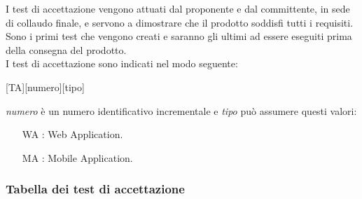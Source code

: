 \documentclass[../../piano-di-qualifica.tex]{subfiles}
\begin{document}
I test di accettazione vengono attuati dal proponente e dal committente, in sede di collaudo finale, e servono a dimostrare che il prodotto soddisfi tutti i requisiti.
Sono i primi test che vengono creati e saranno gli ultimi ad essere eseguiti prima della consegna del prodotto.\\

I test di accettazione sono indicati nel modo seguente:
\begin{center}
  [TA][numero][tipo]
\end{center}
\textit{numero} è un numero identificativo incrementale e \textit{tipo} può assumere questi valori:
\begin{itemize}
  \item [WA]: Web Application.
  \item [MA]: Mobile Application.
\end{itemize}

\subsubsection{Tabella dei test di accettazione}%
\label{subsub:tabella_test_accettazione}
\end{document}
